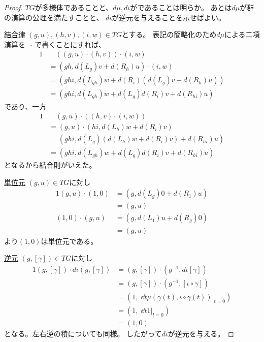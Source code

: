 \documentclass[report]{jlreq}
\begin{document}
\begin{proof}
    $TG$が多様体であることと、$d\mu, d\iota$が{\smooth}であることは明らか。
    あとは$d\mu$が群の演算の公理を満たすことと、
    $d\iota$が逆元を与えることを示せばよい。
    
    \uline{結合律} \quad
    $(g, u), (h, v), (i, w) \in TG$とする。
    表記の簡略化のため$d\mu$による二項演算を
    $\, \cdot \,$で書くことにすれば、
    \begin{alignat}{1}
        &\quad ((g, u) \cdot (h, v)) \cdot (i, w) \\
        &= (gh, d(L_g) v + d(R_h) u) \cdot (i, w) \\
        &= (ghi, d(L_{gh}) w + d(R_i) (d(L_g) v + d(R_h) u)) \\
        &= (ghi, d(L_{gh}) w + d(L_g) d(R_i) v + d(R_{hi}) u)
    \end{alignat}
    であり、一方
    \begin{alignat}{1}
        &\quad (g, u) \cdot ((h, v) \cdot (i, w)) \\
        &= (g, u) \cdot (hi, d(L_h) w + d(R_i) v) \\
        &= (ghi, d(L_g) (d(L_h) w + d(R_i) v) + d(R_{hi}) u) \\
        &= (ghi, d(L_{gh}) w + d(L_g) d(R_i) v + d(R_{hi}) u)
    \end{alignat}
    となるから結合則がいえた。

    \uline{単位元} \quad
    $(g, u) \in TG$に対し
    \begin{alignat}{1}
        (g, u) \cdot (1, 0)
            &= (g, d(L_g) 0 + d(R_1) u) \\
            &= (g, u) \\
        (1, 0) \cdot (g, u)
            &= (g, d(L_1) u + d(R_g) 0) \\
            &= (g, u)
    \end{alignat}
    より$(1, 0)$は単位元である。

    \uline{逆元} \quad
    $(g, [\gamma]) \in TG$に対し
    \begin{alignat}{1}
        (g, [\gamma]) \cdot d\iota(g, [\gamma])
            &= (g, [\gamma]) \cdot (g^{-1}, d\iota [\gamma]) \\
            &= (g, [\gamma]) \cdot (g^{-1}, [\iota \circ \gamma]) \\
            &= \left(
                1, \;
                \dd{t} \mu(\gamma(t), \iota \circ \gamma(t)) \Big|_{t = 0}
            \right) \\
            &= \left(
                1, \;
                \dd{t} 1 \Big|_{t = 0}
            \right) \\
            &= (1, 0)
    \end{alignat}
    となる。左右逆の積についても同様。
    したがって$d\iota$が逆元を与える。
\end{proof}
\end{document}
